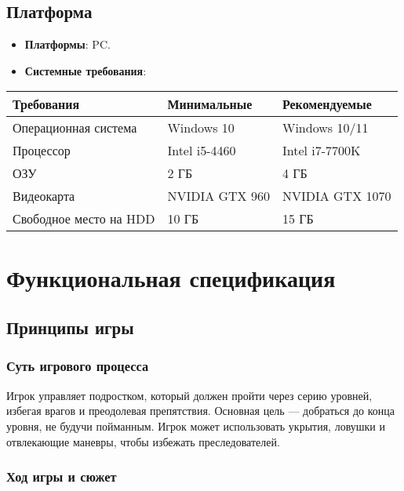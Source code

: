 \documentclass[a4paper,12pt]{article}
\begin{document}
\subsection{Платформа}

\begin{itemize}
    \item \textbf{Платформы}: PC.
    \item \textbf{Системные требования}:
\end{itemize}

\begin{center}
\begin{tabular}{|l|l|l|}
\hline
Требования              & Минимальные         & Рекомендуемые         \\ \hline
Операционная система    & Windows 10          & Windows 10/11         \\ \hline
Процессор               & Intel i5-4460       & Intel i7-7700K        \\ \hline
ОЗУ                     & 2 ГБ                & 4 ГБ                 \\ \hline
Видеокарта              & NVIDIA GTX 960      & NVIDIA GTX 1070       \\ \hline
Свободное место на HDD  & 10 ГБ               & 15 ГБ                 \\ \hline
\end{tabular}
\end{center}

\newpage

\section{Функциональная спецификация}

\subsection{Принципы игры}

\subsubsection{Суть игрового процесса}

Игрок управляет подростком, который должен пройти через серию уровней, избегая врагов и преодолевая препятствия. Основная цель — добраться до конца уровня, не будучи пойманным. Игрок может использовать укрытия, ловушки и отвлекающие маневры, чтобы избежать преследователей.

\subsubsection{Ход игры и сюжет}
\end{document}
